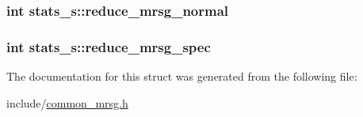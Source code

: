 \hypertarget{structstats__s_a5dcff2c8a394579feaa7fad6bf34ecc6}{
\subsubsection[{reduce\-\_\-mrsg\-\_\-normal}]{\setlength{\rightskip}{0pt plus 5cm}int {\bf stats\-\_\-s\-::reduce\-\_\-mrsg\-\_\-normal}}}\label{structstats__s_a5dcff2c8a394579feaa7fad6bf34ecc6}
\hypertarget{structstats__s_afb2bfea4c36e73faab46a26790ec12a0}{
\subsubsection[{reduce\-\_\-mrsg\-\_\-spec}]{\setlength{\rightskip}{0pt plus 5cm}int {\bf stats\-\_\-s\-::reduce\-\_\-mrsg\-\_\-spec}}}\label{structstats__s_afb2bfea4c36e73faab46a26790ec12a0}


\-The documentation for this struct was generated from the following file\-:\begin{DoxyCompactItemize}
\item 
include/\hyperlink{common__mrsg_8h}{common\-\_\-mrsg.\-h}\end{DoxyCompactItemize}
